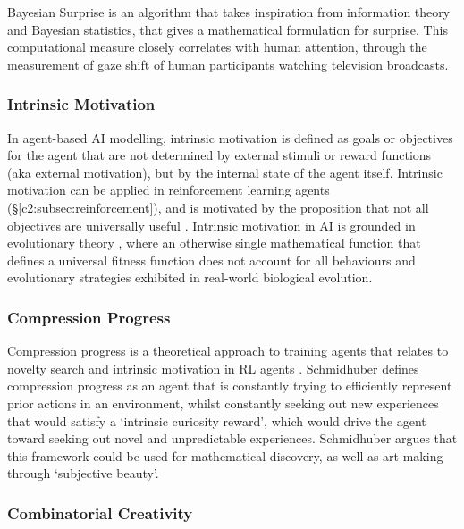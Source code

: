 Bayesian Surprise \citep{itti2005bayesian,itti2009bayesian} is an algorithm that takes inspiration from information theory and Bayesian statistics, that gives a mathematical formulation for surprise. 
This computational measure closely correlates with human attention, through the measurement of gaze shift of human participants watching television broadcasts.

\subsubsection{Intrinsic Motivation}

In agent-based AI modelling, intrinsic motivation is defined as goals or objectives for the agent that are not determined by external stimuli or reward functions (aka external motivation), but by the internal state of the agent itself. 
Intrinsic motivation can be applied in reinforcement learning agents \citep{chentanez2004intrinsically} (\S \ref{c2:subsec:reinforcement}), and is motivated by the proposition that not all objectives are universally useful \citep{barto2013intrinsic}.
Intrinsic motivation in AI is grounded in evolutionary theory \citep{singh2010intrinsically}, where an otherwise single mathematical function that defines a universal fitness function does not account for all behaviours and evolutionary strategies exhibited in real-world biological evolution.

\subsubsection{Compression Progress}

Compression progress \citep{schmidhuber2008driven} is a theoretical approach to training agents that relates to novelty search \citep{lehman2008exploiting} and intrinsic motivation in RL agents \citep{chentanez2004intrinsically}.
Schmidhuber defines compression progress as an agent that is constantly trying to efficiently represent prior actions in an environment, whilst constantly seeking out new experiences that would satisfy a `intrinsic curiosity reward', which would drive the agent toward seeking out novel and unpredictable experiences.
Schmidhuber argues that this framework could be used for mathematical discovery, as well as art-making through `subjective beauty'.

\subsubsection{Combinatorial Creativity}

